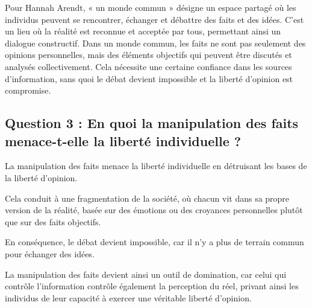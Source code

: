 \documentclass[a4paper,12pt]{article}
\begin{document}
Pour Hannah Arendt, « un monde commun » désigne un espace partagé où les individus peuvent se rencontrer, échanger et débattre des faits et des idées. C'est un lieu où la réalité est reconnue et acceptée par tous, permettant ainsi un dialogue constructif. Dans un monde commun, les faits ne sont pas seulement des opinions personnelles, mais des éléments objectifs qui peuvent être discutés et analysés collectivement. Cela nécessite une certaine confiance dans les sources d'information, sans quoi le débat devient impossible et la liberté d'opinion est compromise.

\subsection{Question 3 : En quoi la manipulation des faits menace-t-elle la liberté individuelle ?}

La manipulation des faits menace la liberté individuelle en détruisant les bases de la liberté d’opinion. 

Cela conduit à une fragmentation de la société, où chacun vit dans sa propre version de la réalité, basée sur des émotions ou des croyances personnelles plutôt que sur des faits objectifs. 

En conséquence, le débat devient impossible, car il n’y a plus de terrain commun pour échanger des idées. 

La manipulation des faits devient ainsi un outil de domination, car celui qui contrôle l’information contrôle également la perception du réel, privant ainsi les individus de leur capacité à exercer une véritable liberté d’opinion.
\end{document}

